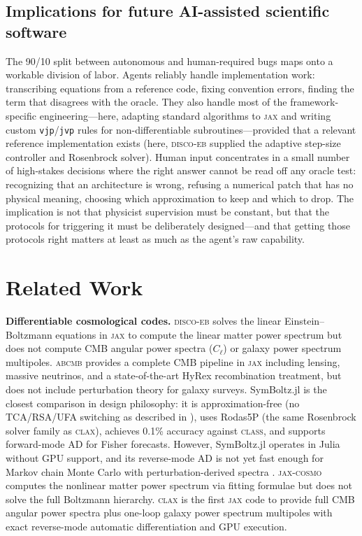 \documentclass{article}
\newcommand{\clax}{\textsc{clax}\xspace}
\newcommand{\class}{\textsc{class}\xspace}
\newcommand{\discoeb}{\textsc{disco-eb}\xspace}
\newcommand{\abcmb}{\textsc{abcmb}\xspace}
\newcommand{\jax}{\textsc{jax}\xspace}
\newcommand{\Cl}{C_\ell}
\begin{document}
\subsection{Implications for future AI-assisted scientific software}

The 90/10 split between autonomous and human-required bugs maps onto a workable division of labor.
Agents reliably handle implementation work: transcribing equations from a reference code, fixing convention errors, finding the term that disagrees with the oracle.
They also handle most of the framework-specific engineering---here, adapting standard algorithms to \jax and writing custom \texttt{vjp}/\texttt{jvp} rules for non-differentiable subroutines---provided that a relevant reference implementation exists (here, \discoeb supplied the adaptive step-size controller and Rosenbrock solver).
Human input concentrates in a small number of high-stakes decisions where the right answer cannot be read off any oracle test: recognizing that an architecture is wrong, refusing a numerical patch that has no physical meaning, choosing which approximation to keep and which to drop.
The implication is not that physicist supervision must be constant, but that the protocols for triggering it must be deliberately designed---and that getting those protocols right matters at least as much as the agent's raw capability.

\section{Related Work}
\label{sec:related}

\textbf{Differentiable cosmological codes.}
\discoeb \citep{hahn2023} solves the linear Einstein--Boltzmann equations in \jax to compute the linear matter power spectrum but does not compute CMB angular power spectra ($\Cl$) or galaxy power spectrum multipoles.
\abcmb \citep{zhou2026} provides a complete CMB pipeline in \jax including lensing, massive neutrinos, and a state-of-the-art HyRex recombination treatment, but does not include perturbation theory for galaxy surveys.
SymBoltz.jl \citep{sletmoen2026} is the closest comparison in design philosophy: it is approximation-free (no TCA/RSA/UFA switching as described in \citealt{blas2011}), uses Rodas5P (the same Rosenbrock solver family as \clax), achieves 0.1\% accuracy against \class, and supports forward-mode AD for Fisher forecasts.
However, SymBoltz.jl operates in Julia without GPU support, and its reverse-mode AD is not yet fast enough for Markov chain Monte Carlo with perturbation-derived spectra \citep{sletmoen2026}.
\textsc{jax-cosmo} \citep{lemos2023} computes the nonlinear matter power spectrum via fitting formulae but does not solve the full Boltzmann hierarchy.
\clax is the first \jax code to provide full CMB angular power spectra plus one-loop galaxy power spectrum multipoles with exact reverse-mode automatic differentiation and GPU execution.
\end{document}
